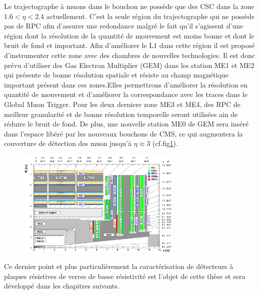 \item Le trajectographe à muons dans le bouchon ne possède que des CSC dans la zone $1.6<\eta<2.4$ actuellement. C'est la seule région du trajectographe qui ne possède pas de RPC afin d'assurer une redondance malgré le fait qu'il s'agissent d'une région dont la résolution de la quantité de mouvement est moins bonne et dont le bruit de fond et important. Afin d'améliorer le L1 dans cette région il est proposé d'instrumenter cette zone avec des chambres de nouvelles technologies. Il est donc prévu d'utiliser des Gas Electron Multiplier (GEM) dans les station ME1 et ME2 qui présente de bonne résolution spatiale et résiste au champ magnétique important présent dans ces zones.Elles permettrons d'améliorer la résolution en quantité de mouvement et d'améliorer la correspondance avec les traces dans le Global Muon Trigger. Pour les deux derniere zone ME3 et ME4, des RPC de meilleur granularité et de bonne résolution temporelle seront utilisées ain de réduire le bruit de fond.  De plus, une nouvelle station ME0 de GEM sera inséré dans l'espace libéré par les nouveaux bouchons de CMS, ce qui augmentera la couverture de détection des muon jusqu'à $\eta\approx3$ (cf.fig\ref{end}). 
	\begin{figure}[ht!]
	\centering
	\includegraphics[width=0.70\textwidth]{CMS/endcap.png}
	\label{end}
\end{figure}
Ce dernier point et plus particulièrement la caractérisation de détecteurs à plaques résistives de verres de basse résistivité est l'objet de cette thèse et sera développé dans les chapitres suivants.